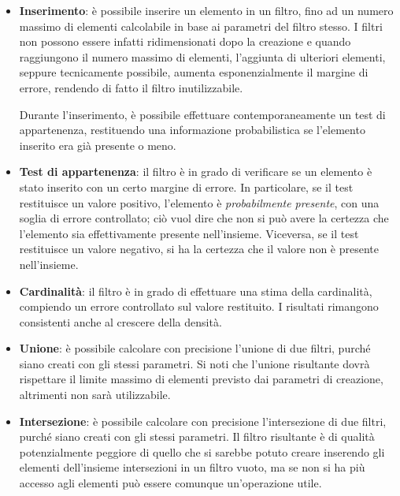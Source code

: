 \begin{itemize}
	\medskip

	\item
	\textbf{Inserimento}: è possibile inserire un elemento in un filtro, fino ad un numero massimo
	di elementi calcolabile in base ai parametri del filtro stesso. I filtri non possono essere
	infatti ridimensionati dopo la creazione e quando raggiungono il numero massimo di elementi,
	l'aggiunta di ulteriori elementi, seppure tecnicamente possibile, aumenta esponenzialmente 
	il margine di errore, rendendo di fatto il filtro inutilizzabile.

	Durante l'inserimento, è possibile effettuare contemporaneamente un test di appartenenza,
	restituendo una informazione probabilistica se l'elemento inserito era già presente o meno.

	\item
	\textbf{Test di appartenenza}: il filtro è in grado di verificare se un elemento è stato
	inserito con un certo margine di errore. In particolare, se il test restituisce un valore
	positivo, l'elemento è \emph{probabilmente presente}, con una soglia di errore controllato;
	ciò vuol dire che non si può avere la certezza che l'elemento sia effettivamente presente
	nell'insieme. Viceversa, se il test restituisce un valore negativo, si ha la certezza che il
	valore non è presente nell'insieme.

	\item
	\textbf{Cardinalità}: il filtro è in grado di effettuare una stima della cardinalità, compiendo
	un errore controllato sul valore restituito. I risultati rimangono consistenti anche al crescere
	della densità.

	\item
	\textbf{Unione}: è possibile calcolare con precisione l'unione di due filtri, purché siano
	creati con gli stessi parametri. Si noti che l'unione risultante dovrà rispettare il limite
	massimo di elementi previsto dai parametri di creazione, altrimenti non sarà utilizzabile.

	\item
	\textbf{Intersezione}: è possibile calcolare con precisione l'intersezione di due filtri, purché
	siano creati con gli stessi parametri. Il filtro risultante è di qualità potenzialmente peggiore
	di quello che si sarebbe potuto creare inserendo gli elementi dell'insieme intersezioni in un
	filtro vuoto, ma se non si ha più accesso agli elementi può essere comunque un'operazione
	utile.

\end{itemize}

